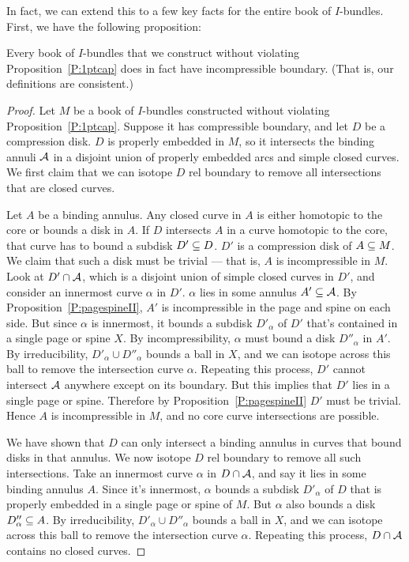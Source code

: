 In fact, we can extend this to a few key facts for the entire book of
$I$-bundles. First, we have the following proposition:

\begin{prop}\label{P:boibincomp}

Every book of $I$-bundles that we construct without violating
Proposition~\ref{P:1ptcap} does in fact have incompressible boundary. (That is,
our definitions are consistent.)

\end{prop}

\begin{proof}

Let $M$ be a book of $I$-bundles constructed without violating
Proposition~\ref{P:1ptcap}. Suppose it has compressible boundary, and let $D$
be a compression disk. $D$ is properly embedded in $M$, so it intersects the
binding annuli $\mathcal{A}$ in a disjoint union of properly embedded arcs and simple
closed curves.  We first claim that we can isotope $D$ rel boundary to remove
all intersections that are closed curves.

Let $A$ be a binding annulus. Any closed curve in $A$ is either homotopic to
the core or bounds a disk in $A$. If $D$ intersects $A$ in a curve homotopic to
the core, that curve has to bound a subdisk $D' \subseteq D$. $D'$ is a compression
disk of $A \subseteq M$. We claim that such a disk must be trivial --- that is, $A$
is incompressible in $M$.  Look at $D' \cap \mathcal{A}$, which is a disjoint union of
simple closed curves in $D'$, and consider an innermost curve $\alpha$ in $D'$.
$\alpha$ lies in some annulus $A' \subseteq \mathcal{A}$.  By
Proposition~\ref{P:pagespineII}, $A'$ is incompressible in the page and spine
on each side. But since $\alpha$ is innermost, it bounds a subdisk $D'_\alpha$
of $D'$ that's contained in a single page or spine $X$. By incompressibility,
$\alpha$ must bound a disk $D''_\alpha$ in $A'$. By irreducibility, $D'_\alpha
\cup D''_\alpha$ bounds a ball in $X$, and we can isotope across this ball to
remove the intersection curve $\alpha$. Repeating this process, $D'$ cannot
intersect $\mathcal{A}$ anywhere except on its boundary. But this implies that $D'$
lies in a single page or spine.  Therefore by Proposition~\ref{P:pagespineII}
$D'$ must be trivial.  Hence $A$ is incompressible in $M$, and no core curve
intersections are possible.

We have shown that $D$ can only intersect a binding annulus in curves that
bound disks in that annulus.  We now isotope $D$ rel boundary to remove all
such intersections.  Take an innermost curve $\alpha$ in $D \cap \mathcal{A}$, and say
it lies in some binding annulus $A$. Since it's innermost, $\alpha$ bounds
a subdisk $D'_\alpha$ of $D$ that is properly embedded in a single page or
spine of $M$. But $\alpha$ also bounds a disk $D''_\alpha \subseteq A$. By
irreducibility, $D'_\alpha \cup D''_\alpha$ bounds a ball in $X$, and we can
isotope across this ball to remove the intersection curve $\alpha$. Repeating
this process, $D \cap \mathcal{A}$ contains no closed curves.


\end{proof}
